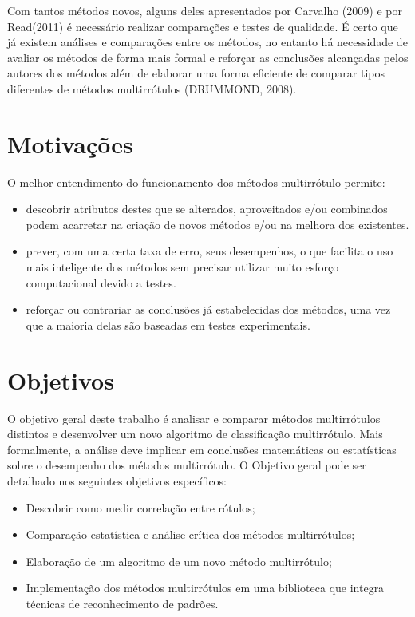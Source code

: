 Com tantos métodos novos, alguns deles apresentados por Carvalho (2009)
e por Read(2011) é necessário realizar comparações e testes de qualidade.
É certo que já existem análises e comparações entre os métodos,
no entanto há necessidade de avaliar os métodos de forma mais formal
e reforçar as conclusões alcançadas pelos autores dos métodos além de elaborar
uma forma eficiente de comparar tipos diferentes de métodos multirrótulos (DRUMMOND, 2008).

\section{Motivações}
O melhor entendimento do funcionamento dos métodos multirrótulo permite:
\begin{itemize}
 \item descobrir atributos destes que se alterados, aproveitados
 e/ou combinados podem acarretar na criação de novos métodos e/ou na melhora dos existentes.
 \item prever, com uma certa taxa de erro, seus desempenhos, o que facilita o uso mais inteligente dos métodos
 sem precisar utilizar muito esforço computacional devido a testes.
 \item reforçar ou contrariar as conclusões já estabelecidas dos métodos, uma vez que a maioria delas são 
 baseadas em testes experimentais.
\end{itemize}

\section{Objetivos}
O objetivo geral deste trabalho é analisar e comparar métodos multirrótulos distintos e 
desenvolver um novo algoritmo de classificação multirrótulo.
Mais formalmente, a análise deve implicar em conclusões matemáticas ou estatísticas sobre o desempenho dos métodos multirrótulo.
O Objetivo geral pode ser detalhado nos seguintes objetivos específicos:
\begin{itemize}
 \item Descobrir como medir correlação entre rótulos;
 \item Comparação estatística e análise crítica dos métodos multirrótulos;
 \item Elaboração de um algoritmo de um novo método multirrótulo;
 \item Implementação dos métodos multirrótulos em uma biblioteca que integra técnicas de reconhecimento de padrões.
\end{itemize}


